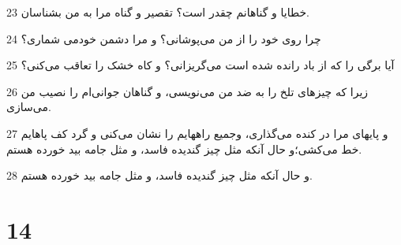 \par 23 خطایا و گناهانم چقدر است؟ تقصیر و گناه مرا به من بشناسان.
\par 24 چرا روی خود را از من می‌پوشانی؟ و مرا دشمن خودمی شماری؟
\par 25 آیا برگی را که از باد رانده شده است می‌گریزانی؟ و کاه خشک را تعاقب می‌کنی؟
\par 26 زیرا که چیزهای تلخ را به ضد من می‌نویسی، و گناهان جوانی‌ام را نصیب من می‌سازی.
\par 27 و پایهای مرا در کنده می‌گذاری، وجمیع راههایم را نشان می‌کنی و گرد کف پاهایم خط می‌کشی؛و حال آنکه مثل چیز گندیده فاسد، و مثل جامه بید خورده هستم.
\par 28 و حال آنکه مثل چیز گندیده فاسد، و مثل جامه بید خورده هستم.
 
\chapter{14}

